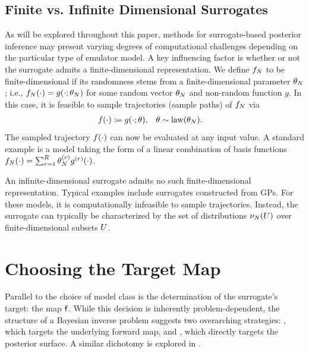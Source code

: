 \documentclass[12pt]{article}
\begin{document}
\subsection{Finite vs. Infinite Dimensional Surrogates}
As will be explored throughout this paper, methods for surrogate-based posterior inference
may present varying degrees of computational challenges depending on the particular type
of emulator model. A key influencing factor is whether or not the surrogate admits a 
finite-dimensional representation. We define $f_{N}$ to be finite-dimensional if its randomness stems from a finite-dimensional
parameter $\theta_{N}$; i.e., $f_{N}(\cdot) = g(\cdot; \theta_{N})$ for some 
random vector $\theta_{N}$ and non-random function $g$.
In this case, it is feasible to sample trajectories (sample paths) of $f_{N}$ via 
\begin{align}
&f(\cdot) \coloneqq g(\cdot; \theta),
&&\theta \sim \mathrm{law}(\theta_{N}).
\end{align}
The sampled trajectory $f(\cdot)$ can now be evaluated at any input value. A standard example is a 
model taking the form of a linear combination of basis functions 
$f_{N}(\cdot) = \sum_{r=1}^{R} \theta_{N}^{(r)} g^{(r)}(\cdot)$.

An infinite-dimensional surrogate admits no such finite-dimensional representation. 
Typical examples include surrogates constructed from GPs. For these models, 
it is computationally infeasible to sample trajectories. Instead, the surrogate can typically be 
characterized by the set of distributions $\nu_{N}(U)$ over finite-dimensional
subsets $U$.

\section{Choosing the Target Map} \label{sec:target-map}
Parallel to the choice of model class is the determination of the surrogate’s target: the map $\mathsf{f}$.
While this decision is inherently problem-dependent, the structure of a Bayesian inverse problem suggests 
two overarching strategies: , which targets the underlying forward map, 
and , which directly targets the posterior surface.
A similar dichotomy is explored in \citet{StuartTeck1,GP_PDE_priors,random_fwd_models}. 
\end{document}
